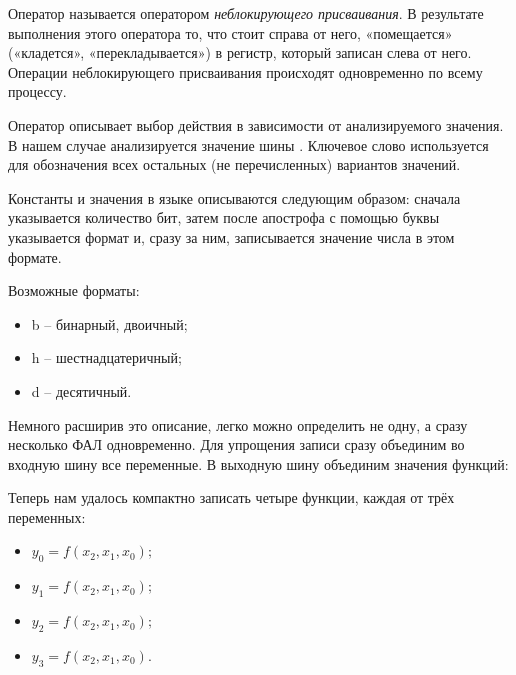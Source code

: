 \par{Оператор \kword{<=} называется оператором \emph{неблокирующего присваивания}. В результате выполнения этого оператора то, что стоит справа от него, «помещается» («кладется», «перекладывается») в регистр, который записан слева от него. Операции неблокирующего присваивания происходят одновременно по всему процессу.}

\par{Оператор  описывает выбор действия в зависимости от анализируемого значения. В нашем случае анализируется значение шины . Ключевое слово  используется для обозначения всех остальных (не перечисленных) вариантов значений.}

\par{Константы и значения в языке  описываются следующим образом: сначала указывается количество бит, затем после апострофа с помощью буквы указывается формат и, сразу за ним, записывается значение числа в этом формате.}

\par{Возможные форматы:
  \begin{itemize}[noitemsep,topsep=0pt, after=\vspace{2pt}]
    \item b – бинарный, двоичный;
    \item h – шестнадцатеричный;
    \item d – десятичный.
  \end{itemize}}

\par{Немного расширив это описание, легко можно определить не одну, а сразу несколько ФАЛ одновременно. Для упрощения записи сразу объединим во входную шину все переменные. В выходную шину объединим значения функций:}



\par{Теперь нам удалось компактно записать четыре функции, каждая от трёх переменных:
\begin{itemize}[noitemsep,topsep=2pt,label={}]
  \item $y_0=f(x_2,x_1,x_0);$
  \item $y_1=f(x_2,x_1,x_0);$
  \item $y_2=f(x_2,x_1,x_0);$
  \item $y_3=f(x_2,x_1,x_0).$
\end{itemize}}

